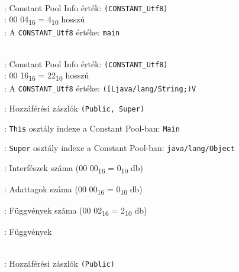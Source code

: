 \begin{compactitem}
\begin{compactitem}
	\item {}   \\
	: Constant Pool Info érték: \lstinline{(CONSTANT_Utf8)} \\
    : 00 04\textsubscript{16} = 4\textsubscript{10} hosszú \\
    : A \lstinline{CONSTANT_Utf8} értéke: \lstinline{main}
	\item {}   \\
	: Constant Pool Info érték: \lstinline{(CONSTANT_Utf8)} \\
    : 00 16\textsubscript{16} = 22\textsubscript{10} hosszú \\
    : A \lstinline{CONSTANT_Utf8} értéke: \lstinline{([Ljava/lang/String;)V}
\end{compactitem}
\item {}: Hozzáférési zászlók \lstinline{(Public, Super)}
\item {}: \lstinline{This} osztály indexe a Constant Pool-ban: \lstinline{Main}
\item {}: \lstinline{Super} osztály indexe a Constant Pool-ban: \lstinline{java/lang/Object}
\item {}: Interfészek száma (00 00\textsubscript{16} = 0\textsubscript{10} db)
\item {}: Adattagok száma (00 00\textsubscript{16} = 0\textsubscript{10} db)
\item {}: Függvények száma (00 02\textsubscript{16} = 2\textsubscript{10} db)
\item {}: Függvények
\begin{compactitem}
    \setlength\itemsep{-5px}
    \item {}     \\
    : Hozzáférési zászlók \lstinline{(Public)} \\

\end{compactitem}
\end{compactitem}
